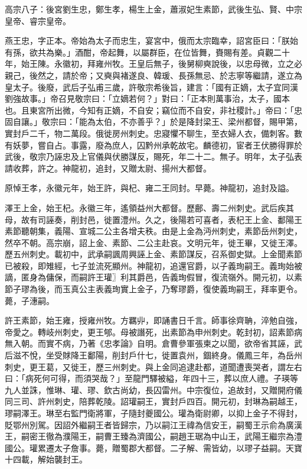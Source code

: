 
\begin{pinyinscope}

 高宗八子：後宮劉生忠，鄭生孝，楊生上金，蕭淑妃生素節，武後生弘、賢、中宗皇帝、睿宗皇帝。



 燕王忠，字正本。帝始為太子而忠生，宴宮中，俄而太宗臨幸，詔宮臣曰：「朕始有孫，欲共為樂。」酒酣，帝起舞，以屬群臣，在位皆舞，賚賜有差。貞觀二十年，始王陳。永徽初，拜雍州牧。王皇后無子，後舅柳奭說後，以忠母微，立之必親己，後然之，請於帝；又奭與褚遂良、韓瑗、長孫無忌、於志寧等繼請，遂立為皇太子。後廢，武后子弘甫三歲，許敬宗希後旨，建言：「國有正嫡，太子宜同漢劉強故事。」帝召見敬宗曰：「立嫡若何？」對曰：「正本則萬事治，太子，國本也。且東宮所出微，今知有正嫡，不自安；竊位而不自安，非社稷計。」帝曰：「忠固自讓。」敬宗曰：「能為太伯，不亦善乎？」於是降封梁王、梁州都督，賜甲第，實封戶二千，物二萬段。俄徙房州刺史。忠寢懼不聊生，至衣婦人衣，備刺客。數有妖夢，嘗自占。事露，廢為庶人，囚黔州承乾故宅。麟德初，宦者王伏勝得罪於武後，敬宗乃誣忠及上官儀與伏勝謀反，賜死，年二十二。無子。明年，太子弘表請收葬，許之。神龍初，追封，又贈太尉、揚州大都督。



 原悼王孝，永徽元年，始王許，與杞、雍二王同封。早薨。神龍初，追封及謚。



 澤王上金，始王杞。永徽三年，遙領益州大都督。歷鄜、壽二州刺史。武后疾其母，故有司誣奏，削封邑，徙置澧州。久之，後陽若可喜者，表杞王上金、鄱陽王素節聽朝集，義陽、宣城二公主各增夫秩。由是上金為沔州刺史，素節岳州刺史，然卒不朝。高宗崩，詔上金、素節、二公主赴哀。文明元年，徙王畢，又徙王澤。歷五州刺史。載初中，武承嗣諷周興誣上金、素節謀反，召系御史獄。上金聞素節已被殺，即雉經，七子並流死顯州。神龍初，追還官爵，以子義珣嗣王。義珣始被謫，匿身為傭保，而嗣許王瓘〗利其爵邑，告義珣假冒，復流嶺外。開元初，以素節子璆為後，而玉真公主表義珣實上金子，乃奪璆爵，復使義珣嗣王，拜率更令。薨，子潓嗣。



 許王素節，始王雍，授雍州牧。方羈丱，即誦書日千言。師事徐齊聃，淬勉自強，帝愛之。轉岐州刺史，更王郇。母被譖死，出素節為申州刺史。乾封初，詔素節病無入朝。而實不病，乃著《忠孝論》自明。倉曹參軍張柬之以聞，欲帝省其誣，武后滋不悅，坐受賕降王鄱陽，削封戶什七，徙置袁州，錮終身。儀鳳三年，為岳州刺史，更王葛，又徙王，歷三州刺史。與上金同追逮赴都，道聞遭喪哭者，謂左右曰：「病死何可得，而須哭哉？」至龍門驛被縊，年四十三，葬以庶人禮。子瑛等九人並誅，惟琳、瓘、璆、欽古尚幼，長囚雷州。中宗復位，追故封，又贈開府儀同三司、許州刺史，陪葬乾陵。詔瓘嗣王，實封戶四百。開元初，封琳為嗣越王，璆嗣澤王。琳至右監門衛將軍，子隨封夔國公。瓘為衛尉卿，以抑上金子不得封，貶鄂州別駕。因詔外繼嗣王者皆歸宗，乃以嗣江王禕為信安王，嗣蜀王示俞為廣漢王，嗣密王徹為濮陽王，嗣曹王臻為濟國公，嗣趙王琚為中山王，武陽王繼宗為澧國公。瓘累遷太子詹事。薨，贈蜀郡大都督。二子解、需皆幼，以璆子益嗣。天寶十四載，解始襲封王。




\end{pinyinscope}
